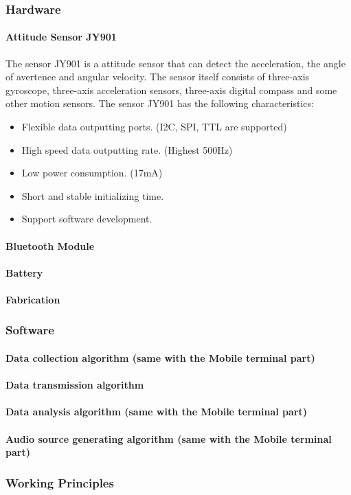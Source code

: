 \subsubsection{Hardware}
\paragraph{Attitude Sensor JY901}

The sensor JY901 is a attitude sensor that can detect the
acceleration, the angle of avertence and angular velocity. The sensor itself
consists of three-axis gyroscope, three-axis acceleration sensors, three-axis
digital compass and some other motion sensors. The sensor JY901 has the
following characteristics: 

\begin{itemize}
\item Flexible data outputting ports. (I2C, SPI, TTL are supported)
\item High speed data outputting rate. (Highest 500Hz)
\item Low power consumption. (17mA)
\item Short and stable initializing time. 
\item Support software development. 
\end{itemize}
\paragraph{Bluetooth Module}
\paragraph{Battery}
\paragraph{Fabrication}
\subsubsection{Software}
\paragraph{Data collection algorithm (same with the Mobile terminal part)}
\paragraph{Data transmission algorithm}
\paragraph{Data analysis algorithm (same with the Mobile terminal part)}
\paragraph{Audio source generating algorithm (same with the Mobile terminal
  part)} 
\subsubsection{Working Principles}
